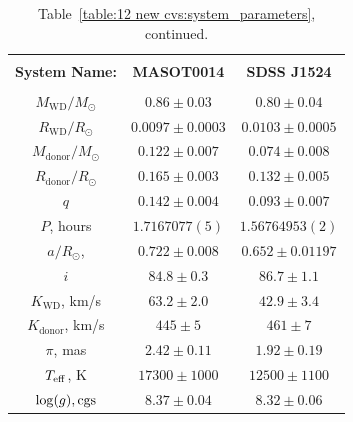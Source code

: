 \begin{landscape}
    \begin{table}
        \centering
        \caption{Table~\ref{table:12 new cvs:system_parameters}, continued.}
        \label{table:12 new cvs:system_parameters cont 2}
        \begin{tabular}{ccc}
            \hline \\
            \textbf{System Name:}      & \textbf{MASOT0014}     & \textbf{SDSS J1524} \\
            \hline \hline \\
            $M_\mathrm{WD}/M_\odot$    & $0.86\pm0.03$          & $0.80\pm0.04$ \\
            $R_\mathrm{WD}/R_\odot$    & $0.0097\pm0.0003$      & $0.0103\pm0.0005$ \\
            $M_\mathrm{donor}/M_\odot$ & $0.122\pm0.007$        & $0.074\pm0.008$ \\
            $R_\mathrm{donor}/R_\odot$ & $0.165\pm0.003$        & $0.132\pm0.005$ \\
            $q$                        & $0.142\pm0.004$        & $0.093\pm0.007$ \\
            \hline
            $P$, hours                 & $1.7167077(5)$         & $1.56764953(2)$ \\
            $a/R_\odot$,               & $0.722\pm0.008$        & $0.652\pm0.01197$ \\
            $i$                        & $84.8\pm0.3$           & $86.7\pm1.1$ \\
            $K_\mathrm{WD}$, km/s      & $63.2\pm2.0$           & $42.9\pm3.4$ \\
            $K_\mathrm{donor}$, km/s   & $445\pm5$              & $461\pm7$ \\
            \hline
            $\pi$, mas                 & $2.42\pm0.11$          & $1.92\pm0.19$ \\
            $T_{\rm eff}$, K           & $17300\pm1000$         & $12500\pm1100$ \\
            $\log(g), {\rm cgs}$       & $8.37\pm0.04$          & $8.32\pm0.06$ \\
            \hline
            \hline
        \end{tabular}
    \end{table}
\end{landscape}
